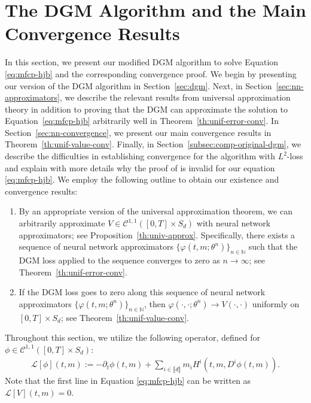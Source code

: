 \documentclass[11pt,reqno]{amsart}
\numberwithin{equation}{section}
\theoremstyle{plain}
\newcommand{\sC}{\mathcal{C}}
\newcommand{\sL}{\mathcal{L}}
\newcommand{\N}{\mathbb{N}}
\newcommand{\lbrs}[1]{\llbracket #1 \rrbracket}
\begin{document}
\section{The DGM Algorithm and the Main Convergence Results}
\label{sec:dgm-conv}
In this section, we present our modified DGM algorithm to solve Equation \eqref{eq:mfcp-hjb} and the corresponding convergence proof. We begin by presenting our version of the DGM algorithm in Section~\ref{sec:dgm}. Next, in Section~\ref{sec:nn-approximators}, we describe the relevant results from universal approximation theory in addition to proving that the DGM can approximate the solution to Equation~\eqref{eq:mfcp-hjb} arbitrarily well in Theorem~\ref{th:unif-error-conv}. In Section~\ref{sec:nn-convergence}, we present our main convergence results in Theorem~\ref{th:unif-value-conv}. Finally, in Section~\ref{subsec:comp-original-dgm}, we describe the difficulties in establishing convergence for the algorithm with $L^2$-loss and explain with more details why the proof of \cite{dgm} is invalid for our equation \eqref{eq:mfcp-hjb}. We employ the following outline to obtain our existence and convergence results:
\begin{enumerate}
\item[(1)] By an appropriate version of the universal approximation theorem, we can arbitrarily approximate $V \in \sC^{1,1}([0,T] \times S_d)$ with neural network approximators; see Proposition~\ref{th:univ-approx}. Specifically, there exists a sequence of neural network approximators $\{\varphi(t, m; \theta^n)\}_{n \in \N}$ such that the DGM loss applied to the sequence converges to zero as $n \to \infty$; see Theorem~\ref{th:unif-error-conv}. 
\item[(2)] If the DGM loss goes to zero along this sequence of neural network approximators $\{\varphi(t, m; \theta^n)\}_{n \in \N}$, then $\varphi(\cdot,\cdot;\theta^n) \to V(\cdot,\cdot)$ uniformly on $[0, T] \times S_d$; see Theorem~\ref{th:unif-value-conv}.
\end{enumerate}
Throughout this section, we utilize the following operator, defined for $\phi \in \sC^{1,1}([0,T] \times S_d)$:
\begin{align}\label{eq:operator1}
    \sL[\phi](t,m) := -\partial_t \phi(t, m) + \sum_{i \in \lbrs{d}} m_i H^i(t, m, D^i \phi(t, m)).
\end{align}
Note that the first line in Equation \eqref{eq:mfcp-hjb} can be written as $\sL[V](t,m)=0$.
\end{document}
